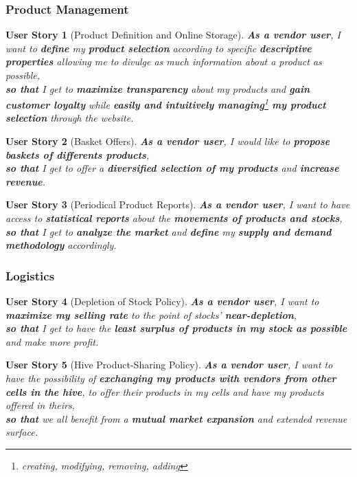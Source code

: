 \documentclass[a4paper,12pt]{book}
\theoremstyle{break}
\newtheorem{userStory}{User Story}
\theoremstyle{break}
\theoremstyle{definition}
\theoremstyle{remark}
\begin{document}
\subsubsection{Product Management}
\begin{userStory}[Product Definition and Online Storage]
\textbf{As a {\color{red} vendor} user}, I want to \textbf{define} my \textbf{product selection} according to specific \textbf{descriptive properties} allowing me to divulge as much information about a product as possible,\\
\indent
\textbf{so that} I get to \textbf{maximize transparency} about my products and \textbf{gain customer loyalty} while \textbf{easily and intuitively managing}\footnote{creating, modifying, removing, adding} \textbf{my product selection} through the website.
\end{userStory}

\begin{userStory}[Basket Offers]
\textbf{As a {\color{red} vendor} user}, I would like to \textbf{propose baskets of differents products},\\
\indent
\textbf{so that} I get to offer a \textbf{diversified selection of my products} and \textbf{increase revenue}.
\end{userStory}

\begin{userStory}[Periodical Product Reports]
\textbf{As a {\color{red} vendor} user}, I want to have access to \textbf{statistical reports} about the \textbf{movements of products and stocks},\\
\indent
\textbf{so that} I get to \textbf{analyze the market} and \textbf{define} my \textbf{supply and demand methodology} accordingly.
\end{userStory}

\subsubsection{Logistics}
\begin{userStory}[Depletion of Stock Policy]
\textbf{As a {\color{red} vendor} user}, I want to \textbf{maximize my selling rate} to the point of stocks' \textbf{near-depletion},\\
\indent
\textbf{so that} I get to have the \textbf{least surplus of products in my stock as possible} and make more profit.
\end{userStory}

\begin{userStory}[Hive Product-Sharing Policy]
\textbf{As a {\color{red} vendor} user}, I want to have the possibility of \textbf{exchanging my products with vendors from other cells in the hive}, to offer their products in my cells and have my products offered in theirs,\\
\indent
\textbf{so that} we all benefit from a \textbf{mutual market expansion} and extended revenue surface.
\end{userStory}
\end{document}
